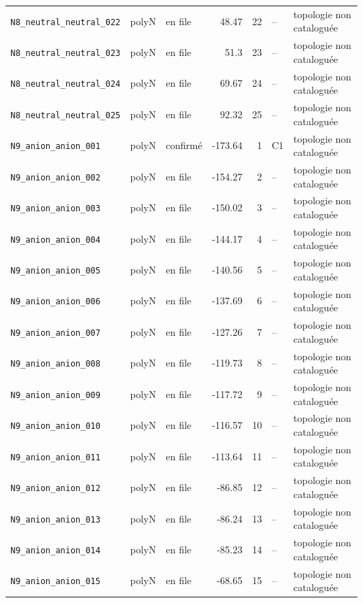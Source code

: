 \begin{longtable}{@{}p{4.2cm}cp{1.3cm}rrp{1.2cm}p{2.6cm}@{}}
\texttt{N8\_neutral\_neutral\_022} & polyN & en file & 48.47 & 22 & -- & topologie non catalogu\'ee \\
\texttt{N8\_neutral\_neutral\_023} & polyN & en file & 51.3 & 23 & -- & topologie non catalogu\'ee \\
\texttt{N8\_neutral\_neutral\_024} & polyN & en file & 69.67 & 24 & -- & topologie non catalogu\'ee \\
\texttt{N8\_neutral\_neutral\_025} & polyN & en file & 92.32 & 25 & -- & topologie non catalogu\'ee \\
\addlinespace
\texttt{N9\_anion\_anion\_001} & polyN & confirm\'e & -173.64 & 1 & C1 & topologie non catalogu\'ee \\
\texttt{N9\_anion\_anion\_002} & polyN & en file & -154.27 & 2 & -- & topologie non catalogu\'ee \\
\texttt{N9\_anion\_anion\_003} & polyN & en file & -150.02 & 3 & -- & topologie non catalogu\'ee \\
\texttt{N9\_anion\_anion\_004} & polyN & en file & -144.17 & 4 & -- & topologie non catalogu\'ee \\
\texttt{N9\_anion\_anion\_005} & polyN & en file & -140.56 & 5 & -- & topologie non catalogu\'ee \\
\texttt{N9\_anion\_anion\_006} & polyN & en file & -137.69 & 6 & -- & topologie non catalogu\'ee \\
\texttt{N9\_anion\_anion\_007} & polyN & en file & -127.26 & 7 & -- & topologie non catalogu\'ee \\
\texttt{N9\_anion\_anion\_008} & polyN & en file & -119.73 & 8 & -- & topologie non catalogu\'ee \\
\texttt{N9\_anion\_anion\_009} & polyN & en file & -117.72 & 9 & -- & topologie non catalogu\'ee \\
\texttt{N9\_anion\_anion\_010} & polyN & en file & -116.57 & 10 & -- & topologie non catalogu\'ee \\
\texttt{N9\_anion\_anion\_011} & polyN & en file & -113.64 & 11 & -- & topologie non catalogu\'ee \\
\texttt{N9\_anion\_anion\_012} & polyN & en file & -86.85 & 12 & -- & topologie non catalogu\'ee \\
\texttt{N9\_anion\_anion\_013} & polyN & en file & -86.24 & 13 & -- & topologie non catalogu\'ee \\
\texttt{N9\_anion\_anion\_014} & polyN & en file & -85.23 & 14 & -- & topologie non catalogu\'ee \\
\texttt{N9\_anion\_anion\_015} & polyN & en file & -68.65 & 15 & -- & topologie non catalogu\'ee \\

\end{longtable}
